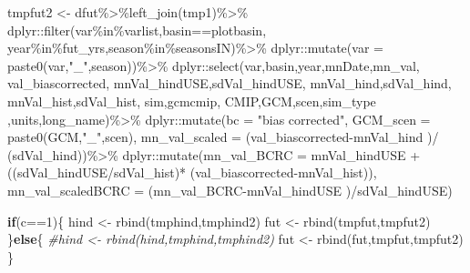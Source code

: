 \documentclass[
]{article}
\newenvironment{Shaded}{\begin{snugshade}}{\end{snugshade}}
\newcommand{\AttributeTok}[1]{\textcolor[rgb]{0.77,0.63,0.00}{#1}}
\newcommand{\CommentTok}[1]{\textcolor[rgb]{0.56,0.35,0.01}{\textit{#1}}}
\newcommand{\ControlFlowTok}[1]{\textcolor[rgb]{0.13,0.29,0.53}{\textbf{#1}}}
\newcommand{\DecValTok}[1]{\textcolor[rgb]{0.00,0.00,0.81}{#1}}
\newcommand{\FunctionTok}[1]{\textcolor[rgb]{0.00,0.00,0.00}{#1}}
\newcommand{\NormalTok}[1]{#1}
\newcommand{\OtherTok}[1]{\textcolor[rgb]{0.56,0.35,0.01}{#1}}
\newcommand{\SpecialCharTok}[1]{\textcolor[rgb]{0.00,0.00,0.00}{#1}}
\newcommand{\StringTok}[1]{\textcolor[rgb]{0.31,0.60,0.02}{#1}}
\begin{document}
\begin{Shaded}
\begin{Highlighting}[]
\NormalTok{         tmpfut2    }\OtherTok{\textless{}{-}}\NormalTok{ dfut}\SpecialCharTok{\%\textgreater{}\%}\FunctionTok{left\_join}\NormalTok{(tmp1)}\SpecialCharTok{\%\textgreater{}\%}
\NormalTok{         dplyr}\SpecialCharTok{::}\FunctionTok{filter}\NormalTok{(var}\SpecialCharTok{\%in\%}\NormalTok{varlist,basin}\SpecialCharTok{==}\NormalTok{plotbasin,}
\NormalTok{                       year}\SpecialCharTok{\%in\%}\NormalTok{fut\_yrs,season}\SpecialCharTok{\%in\%}\NormalTok{seasonsIN)}\SpecialCharTok{\%\textgreater{}\%}
\NormalTok{         dplyr}\SpecialCharTok{::}\FunctionTok{mutate}\NormalTok{(}\AttributeTok{var =} \FunctionTok{paste0}\NormalTok{(var,}\StringTok{"\_"}\NormalTok{,season))}\SpecialCharTok{\%\textgreater{}\%}
\NormalTok{         dplyr}\SpecialCharTok{::}\FunctionTok{select}\NormalTok{(var,basin,year,mnDate,mn\_val, val\_biascorrected, }
\NormalTok{                        mnVal\_hindUSE,sdVal\_hindUSE,}
\NormalTok{                       mnVal\_hind,sdVal\_hind, mnVal\_hist,sdVal\_hist, sim,gcmcmip,}
\NormalTok{                       CMIP,GCM,scen,sim\_type ,units,long\_name)}\SpecialCharTok{\%\textgreater{}\%}
\NormalTok{         dplyr}\SpecialCharTok{::}\FunctionTok{mutate}\NormalTok{(}\AttributeTok{bc =} \StringTok{"bias corrected"}\NormalTok{,}
                       \AttributeTok{GCM\_scen =} \FunctionTok{paste0}\NormalTok{(GCM,}\StringTok{"\_"}\NormalTok{,scen),}
                       \AttributeTok{mn\_val\_scaled =}\NormalTok{ (val\_biascorrected}\SpecialCharTok{{-}}\NormalTok{mnVal\_hind )}\SpecialCharTok{/}
\NormalTok{                         (sdVal\_hind))}\SpecialCharTok{\%\textgreater{}\%}
\NormalTok{          dplyr}\SpecialCharTok{::}\FunctionTok{mutate}\NormalTok{(}\AttributeTok{mn\_val\_BCRC =}\NormalTok{ mnVal\_hindUSE }\SpecialCharTok{+}\NormalTok{ ((sdVal\_hindUSE}\SpecialCharTok{/}\NormalTok{sdVal\_hist)}\SpecialCharTok{*}
\NormalTok{                                                      (val\_biascorrected}\SpecialCharTok{{-}}\NormalTok{mnVal\_hist)), }
                     \AttributeTok{mn\_val\_scaledBCRC =}\NormalTok{ (mn\_val\_BCRC}\SpecialCharTok{{-}}\NormalTok{mnVal\_hindUSE )}\SpecialCharTok{/}\NormalTok{sdVal\_hindUSE)}
       
       \ControlFlowTok{if}\NormalTok{(c}\SpecialCharTok{==}\DecValTok{1}\NormalTok{)\{}
\NormalTok{          hind  }\OtherTok{\textless{}{-}} \FunctionTok{rbind}\NormalTok{(tmphind,tmphind2)}
\NormalTok{          fut   }\OtherTok{\textless{}{-}} \FunctionTok{rbind}\NormalTok{(tmpfut,tmpfut2)}
\NormalTok{       \}}\ControlFlowTok{else}\NormalTok{\{}
          \CommentTok{\#hind  \textless{}{-} rbind(hind,tmphind,tmphind2)}
\NormalTok{          fut   }\OtherTok{\textless{}{-}} \FunctionTok{rbind}\NormalTok{(fut,tmpfut,tmpfut2)}
\NormalTok{       \}}
     

\end{Highlighting}
\end{Shaded}
\end{document}
